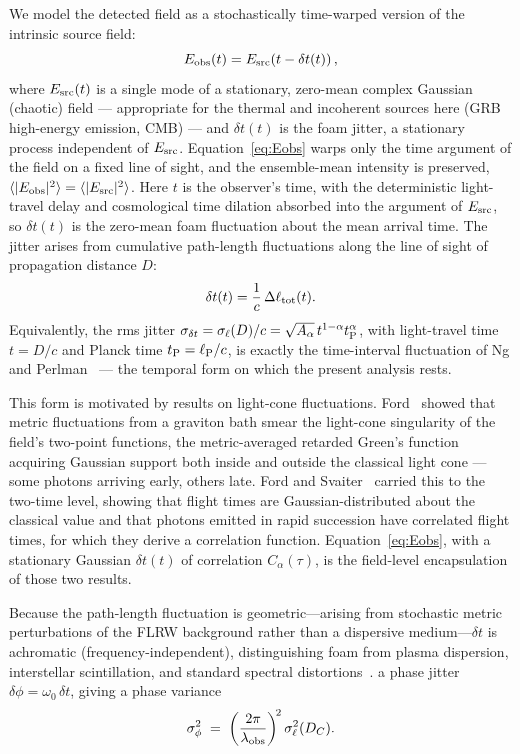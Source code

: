 \documentclass[aps,prd,onecolumn,amsmath,amssymb]{revtex4-2}
\begin{document}
We model the detected field as a stochastically time-warped version of the
intrinsic source field:
\begin{equation}
  E_{\rm obs}(t) = E_{\rm src}\!\left(t - \delta t(t)\right),
  \label{eq:Eobs}
\end{equation}
where $E_{\rm src}(t)$ is a single mode of a stationary, zero-mean complex
Gaussian (chaotic) field --- appropriate for the thermal and incoherent
sources here (GRB high-energy emission, CMB) --- and $\delta t(t)$ is the
foam jitter, a stationary process independent of $E_{\rm src}$.
Equation~\eqref{eq:Eobs} warps only the time argument of the field on
a fixed line of sight, and the ensemble-mean intensity is preserved,
$\langle|E_{\rm obs}|^2\rangle=\langle|E_{\rm src}|^2\rangle$.
Here $t$ is the observer's time, with the deterministic
light-travel delay and cosmological time dilation absorbed into the argument
of $E_{\rm src}$, so $\delta t(t)$ is the zero-mean foam fluctuation about
the mean arrival time.  The jitter arises from cumulative path-length
fluctuations along the line of sight of propagation distance $D$:
\begin{equation}
  \delta t(t) = \frac{1}{c}\,\Delta\ell_{\rm tot}(t).
  \label{eq:jitter}
\end{equation}
Equivalently, the rms jitter
$\sigma_{\delta t}=\sigma_\ell(D)/c=\sqrt{A_\alpha}\,t^{1-\alpha}t_{\rm P}^{\alpha}$,
with light-travel time $t=D/c$ and Planck time $t_{\rm P}=\ell_{\rm P}/c$, is
exactly the time-interval fluctuation of Ng and Perlman~\cite{NgPerlman2022} ---
the temporal form on which the present analysis rests.

This form is motivated by results on light-cone fluctuations.
Ford~\cite{Ford1995} showed that
metric fluctuations from a graviton bath smear the light-cone singularity of
the field's two-point functions, the metric-averaged retarded Green's
function acquiring Gaussian support both inside and outside the classical
light cone --- some photons arriving early, others late.  Ford and
Svaiter~\cite{FordSvaiter1996} carried this to the two-time level, showing
that flight times are Gaussian-distributed about the classical value and
that photons emitted in rapid succession have correlated flight
times, for which they derive a correlation function.
Equation~\eqref{eq:Eobs}, with a stationary Gaussian $\delta t(t)$ of
correlation $C_\alpha(\tau)$, is the field-level encapsulation of those two
results.

Because the path-length fluctuation is geometric---arising from stochastic
metric perturbations of the FLRW background rather than a dispersive
medium---$\delta t$ is achromatic (frequency-independent), distinguishing foam
from plasma dispersion, interstellar scintillation, and standard spectral
distortions~\cite{NgPerlman2022}.   a phase jitter
$\delta\phi=\omega_0\,\delta t$, giving a phase variance
\begin{equation}
  \sigma_\phi^2 \;=\; \left(\frac{2\pi}{\lambda_{\rm obs}}\right)^{\!2}
  \sigma_\ell^2(D_C).
  \label{eq:sigmaphi_cosmo}
\end{equation}
\end{document}
